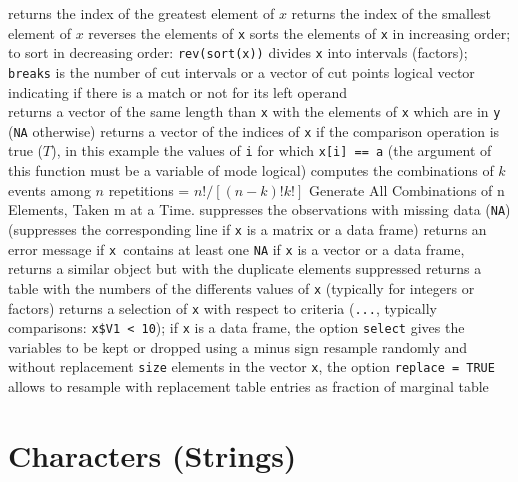 	{ returns the index of the greatest element of $x$}
	{ returns the index of the smallest element of $x$}
	{ reverses the elements of {\tt x}}
	{sorts the elements of {\tt x} in increasing order; to sort in decreasing order: {\tt rev(sort(x))}}
	{divides {\tt x} into intervals (factors); {\tt breaks} is the number of cut intervals or a vector of cut points}
	{logical vector indicating if there is a match or not for its left operand\\}
	{returns a vector of the same length than {\tt x}
    with the elements of {\tt x} which are in {\tt y} ({\tt NA}
    otherwise)}
	{returns a vector of the indices of {\tt x} if the
comparison operation is true ($T$), in this example the values of {\tt i} for
which {\tt x[i] == a} (the argument of this function must be a variable of mode
logical)}
	{ computes the combinations of $k$ events among $n$ repetitions = $n!/[(n-k)!k!]$}
	{ Generate All Combinations of n Elements, Taken m at a Time.}
	{suppresses the observations with missing data ({\tt NA}) (suppresses the corresponding line if {\tt x} is a matrix or a data frame)}
	{returns an error message if {\tt x }contains at least one {\tt NA}}
	{if {\tt x} is a vector or a data frame, returns a similar object but with the duplicate elements suppressed}
	{returns a table with the numbers of the differents values of {\tt x} (typically for integers or factors)}
	{returns a selection of {\tt x} with respect to criteria ({\tt ...}, typically comparisons: {\tt x\$V1 < 10}); if {\tt x} is a data frame, the option {\tt select} gives the variables to be kept or dropped using a minus sign}
	{resample randomly and without replacement {\tt size}
elements in the vector {\tt x}, the option {\tt replace = TRUE} allows to
resample with replacement}
	{table entries as fraction of marginal table}

\section{Characters (Strings)}{}

